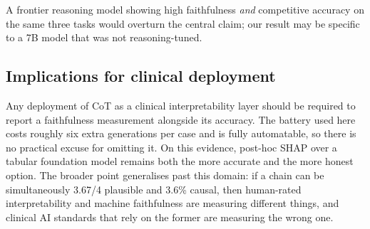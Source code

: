  A frontier reasoning model showing high faithfulness
\emph{and} competitive accuracy on the same three tasks would overturn the central claim; our result
may be specific to a 7B model that was not reasoning-tuned.

\subsection{Implications for clinical deployment}

Any deployment of CoT as a clinical interpretability layer should be required to report a
faithfulness measurement alongside its accuracy. The battery used here costs roughly six extra
generations per case and is fully automatable, so there is no practical excuse for omitting it. On
this evidence, post-hoc SHAP over a tabular foundation model remains both the more accurate and the
more honest option. The broader point generalises past this domain: if a chain can be simultaneously
3.67/4 plausible and 3.6\% causal, then human-rated interpretability and machine faithfulness are
measuring different things, and clinical AI standards that rely on the former are measuring the
wrong one.
